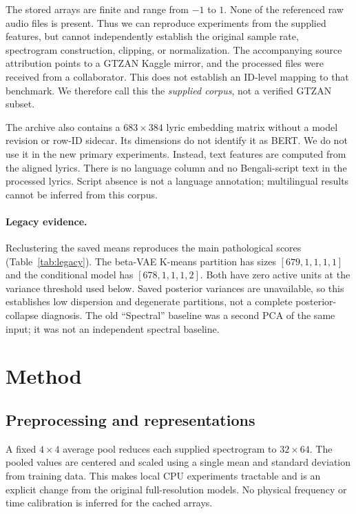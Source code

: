\documentclass{article}
\begin{document}
The stored arrays are finite and range from $-1$ to $1$. None of the referenced
raw audio files is present. Thus we can reproduce experiments from the supplied
features, but cannot independently establish the original sample rate,
spectrogram construction, clipping, or normalization. The accompanying source attribution points to a
GTZAN Kaggle mirror, and the processed files were received from a collaborator. This does not establish an ID-level mapping
to that benchmark. We therefore call this the \emph{supplied corpus}, not a
verified GTZAN subset.

The archive also contains a $683\times384$ lyric embedding matrix without a
model revision or row-ID sidecar. Its dimensions do not identify it as BERT.
We do not use it in the new primary experiments. Instead, text features are
computed from the aligned lyrics. There is no language column and no
Bengali-script text in the processed lyrics. Script absence is not a language
annotation; multilingual results cannot be inferred from this corpus.

\paragraph{Legacy evidence.}
Reclustering the saved means reproduces the main pathological scores
(Table~\ref{tab:legacy}). The beta-VAE K-means partition has sizes
$[679,1,1,1,1]$ and the conditional model has $[678,1,1,1,2]$. Both have zero
active units at the variance threshold used below. Saved posterior variances
are unavailable, so this establishes low dispersion and degenerate partitions,
not a complete posterior-collapse diagnosis. The old ``Spectral'' baseline was
a second PCA of the same input; it was not an independent spectral baseline.


\section{Method}
\label{sec:method}
\subsection{Preprocessing and representations}
A fixed $4\times4$ average pool reduces each supplied spectrogram to
$32\times64$. The pooled values are centered and scaled using a single mean
and standard deviation from training data. This makes local CPU experiments
tractable and is an explicit change from the original full-resolution models.
No physical frequency or time calibration is inferred for the cached arrays.
\end{document}
